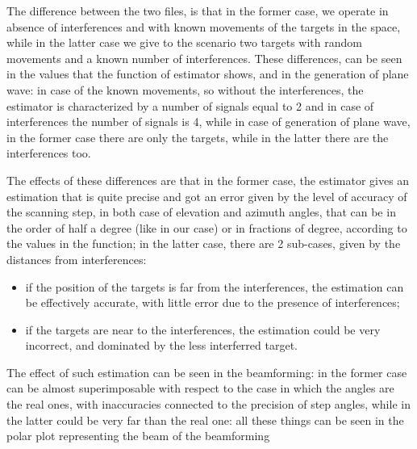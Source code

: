 \documentclass[a4paper,10pt]{article}
\begin{document}
The difference between the two files, is that in the former case, we operate in absence of interferences and with known movements of the targets in the space, while in the latter case we give to the scenario two targets with random movements and a known number of interferences.
These differences, can be seen in the values that the function of
estimator shows, and in the generation of plane wave: in case of the known movements, so without the interferences, the estimator is characterized by a number of signals equal to 2 and in case of interferences the number of signals is 4, while in case of generation of plane wave, in the former case there are only the targets, while in the latter there are the interferences too.

The effects of these differences are that in the former case, the estimator gives an estimation that is quite precise and got an error given by the level of accuracy of the scanning step, in both case of elevation and azimuth angles, that can be in the order of half a degree (like in our case) or in fractions of degree, according to the values in the function; in the latter case, there are 2 sub-cases, given by the distances from interferences:
\begin{itemize}
    \item  if the position of the targets is far from the interferences, the estimation can be effectively accurate, with little error due to the presence of interferences;
    \item  if the targets are near to the interferences, the estimation could be very incorrect, and dominated by the less interferred target.
\end{itemize}

The effect of such estimation can be seen in the beamforming: in the former case can be almost superimposable with respect to the case in which the angles are the real ones, with inaccuracies connected to the precision of step angles, while in the latter could be very far than the real one: all these things can be seen in the polar plot representing the beam of the beamforming
\end{document}
